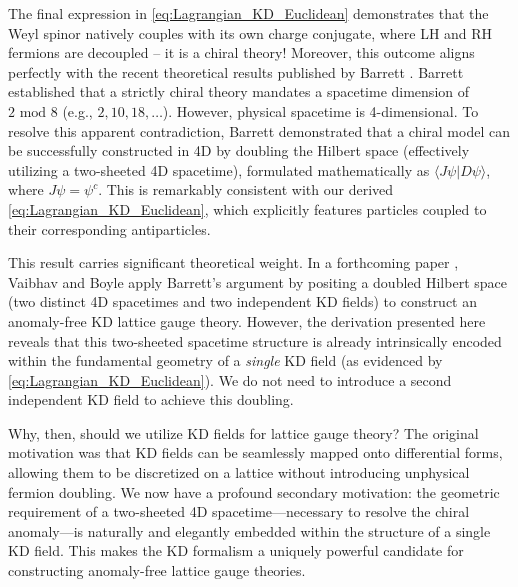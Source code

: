 The final expression in \cref{eq:Lagrangian_KD_Euclidean} demonstrates that the Weyl spinor natively couples with its own charge conjugate, where LH and RH fermions are decoupled -- it is a chiral theory! Moreover, this outcome aligns perfectly with the recent theoretical results published by Barrett \cite{Barrett2024}. Barrett established that a strictly chiral theory mandates a spacetime dimension of $2 \text{ mod } 8$ (e.g., $2, 10, 18, \dots$). However, physical spacetime is 4-dimensional. To resolve this apparent contradiction, Barrett demonstrated that a chiral model can be successfully constructed in 4D by doubling the Hilbert space (effectively utilizing a two-sheeted 4D spacetime), formulated mathematically as $\langle J\psi|D\psi\rangle$, where $J\psi=\psi^c$. This is remarkably consistent with our derived \cref{eq:Lagrangian_KD_Euclidean}, which explicitly features particles coupled to their corresponding antiparticles.

This result carries significant theoretical weight. In a forthcoming paper \cite{BoyleVaibhav}, Vaibhav and Boyle apply Barrett's argument by positing a doubled Hilbert space (two distinct 4D spacetimes and two independent KD fields) to construct an anomaly-free KD lattice gauge theory. However, the derivation presented here reveals that this two-sheeted spacetime structure is already intrinsically encoded within the fundamental geometry of a \textit{single} KD field (as evidenced by \cref{eq:Lagrangian_KD_Euclidean}). We do not need to introduce a second independent KD field to achieve this doubling. 

Why, then, should we utilize KD fields for lattice gauge theory? The original motivation was that KD fields can be seamlessly mapped onto differential forms, allowing them to be discretized on a lattice without introducing unphysical fermion doubling. We now have a profound secondary motivation: the geometric requirement of a two-sheeted 4D spacetime—necessary to resolve the chiral anomaly—is naturally and elegantly embedded within the structure of a single KD field. This makes the KD formalism a uniquely powerful candidate for constructing anomaly-free lattice gauge theories.

